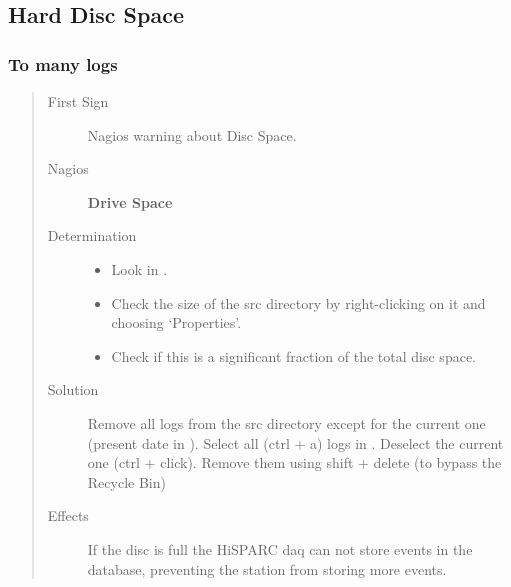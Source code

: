 \documentclass[a4paper,11pt,english]{sphinxmanual}
\begin{document}
\subsection{Hard Disc Space}
\label{known-issues:hard-disc-space}

\subsubsection{To many logs}
\label{known-issues:to-many-logs}\begin{quote}\begin{description}
\item[{First Sign}] \leavevmode
Nagios warning about Disc Space.

\item[{Nagios}] \leavevmode
\textbf{Drive Space}

\item[{Determination}] \leavevmode\begin{itemize}
\item {} 
Look in .

\item {} 
Check the size of the src directory by right-clicking on it and
choosing `Properties'.

\item {} 
Check if this is a significant fraction of the total disc space.

\end{itemize}

\item[{Solution}] \leavevmode
Remove all logs from the src directory except for the current
one (present date in ). Select all
(ctrl + a) logs in .
Deselect the current one (ctrl + click). Remove them using
shift + delete (to bypass the Recycle Bin)

\item[{Effects}] \leavevmode
If the disc is full the HiSPARC daq can not store events in
the database, preventing the station from storing more events.

\end{description}\end{quote}
\end{document}
